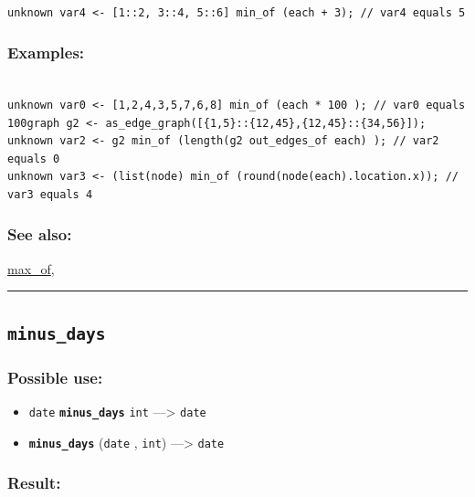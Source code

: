 \documentclass[]{book}
\providecommand{\tightlist}{%
  \setlength{\itemsep}{0pt}\setlength{\parskip}{0pt}}
\theoremstyle{definition}
\theoremstyle{definition}
\theoremstyle{definition}
\theoremstyle{remark}
\begin{document}
\begin{verbatim}
 
unknown var4 <- [1::2, 3::4, 5::6] min_of (each + 3); // var4 equals 5
\end{verbatim}

\subsubsection{Examples:}\label{examples-242}

\begin{verbatim}
 
unknown var0 <- [1,2,4,3,5,7,6,8] min_of (each * 100 ); // var0 equals 100graph g2 <- as_edge_graph([{1,5}::{12,45},{12,45}::{34,56}]);  
unknown var2 <- g2 min_of (length(g2 out_edges_of each) ); // var2 equals 0 
unknown var3 <- (list(node) min_of (round(node(each).location.x)); // var3 equals 4
\end{verbatim}

\subsubsection{See also:}\label{see-also-142}

\href{operators-i-to-m.html\#max_of}{max\_of},

\begin{center}\rule{0.5\linewidth}{\linethickness}\end{center}

\subsection{\texorpdfstring{\texttt{minus\_days}}{minus\_days}}\label{minus_days}

\subsubsection{Possible use:}\label{possible-use-353}

\begin{itemize}
\tightlist
\item
  \texttt{date} \textbf{\texttt{minus\_days}} \texttt{int}
  ---\textgreater{} \texttt{date}
\item
  \textbf{\texttt{minus\_days}} (\texttt{date} , \texttt{int})
  ---\textgreater{} \texttt{date}
\end{itemize}

\subsubsection{Result:}\label{result-342}
\end{document}
